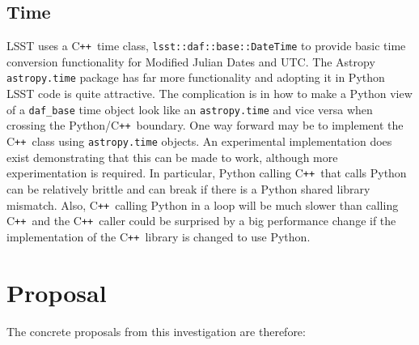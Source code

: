 \documentclass[]{spie}  %
\newcommand{\CPP}{C\texttt{++}\xspace}  %
\begin{document}
\subsection{Time}

LSST uses a \CPP\ time class, \texttt{lsst::daf::base::DateTime} to provide basic time conversion functionality for Modified Julian Dates and UTC.
The Astropy \texttt{astropy.time} package has far more functionality and adopting it in Python LSST code is quite attractive.
The complication is in how to make a Python view of a \texttt{daf\_base} time object look like an \texttt{astropy.time} and vice versa when crossing the Python/\CPP\ boundary.
One way forward may be to implement the \CPP\ class using \texttt{astropy.time} objects.
An experimental implementation does exist demonstrating that this can be made to work, although more experimentation is required.
In particular, Python calling \CPP\ that calls Python can be relatively brittle and can break if there is a Python shared library mismatch.
Also, \CPP\ calling Python in a loop will be much slower than calling \CPP\ and the \CPP\ caller could be surprised by a big performance change if the implementation of the \CPP\ library is changed to use Python.

\section{Proposal}

The concrete proposals from this investigation are therefore:
\end{document}
